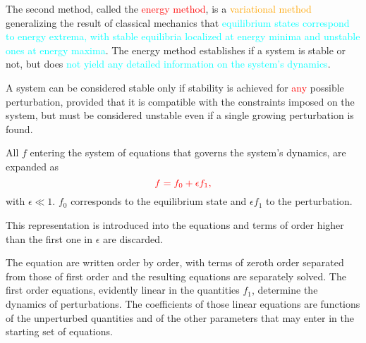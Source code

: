\documentclass[12pt,a4paper]{article}
\begin{document}
The second method, called the \textcolor{red}{energy method}, is a \textcolor{orange}{variational method} generalizing the result of classical mechanics that \textcolor{cyan}{equilibrium states correspond to energy extrema, with stable equilibria localized at energy minima and unstable ones at energy maxima}. The energy method establishes if a system is stable or not, but does \textcolor{cyan}{not yield any detailed information on the system's dynamics}.

A system can be considered stable only if stability is achieved for \textcolor{red}{any} possible perturbation, provided that it is compatible with the constraints imposed on the system, but must be considered unstable even if a single growing perturbation is found. 

All $f$ entering the system of equations that governs the system's dynamics, are expanded as
\begin{equation*}
\color{red} f = f_0 + \epsilon f_1,
\end{equation*}
with $\epsilon \ll 1$. $f_0$ corresponds to the equilibrium state and $\epsilon f_1$ to the perturbation. 

This representation is introduced into the equations and terms of order higher than the first one in $\epsilon$ are discarded.

The equation are written order by order, with terms of zeroth order separated from those of first order and the resulting equations are separately solved. The first order equations, evidently linear in the quantities $f_1$, determine the dynamics of perturbations. The coefficients of those linear equations are functions of the unperturbed quantities and of the other parameters that may enter in the starting set of equations.











\end{document}
